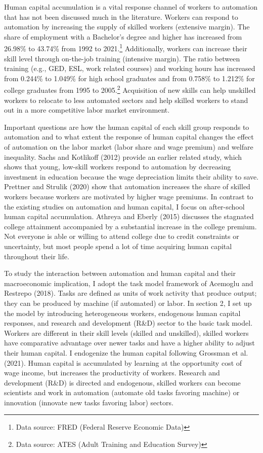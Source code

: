 \documentclass[12pt]{article}
\begin{document}
Human capital accumulation is a vital response channel of workers to automation that has not been discussed much in the literature. Workers can respond to automation by increasing the supply of skilled workers (extensive margin). The share of employment with a Bachelor's degree and higher has increased from 26.98\% to 43.74\% from 1992 to 2021.\footnote{Data source: FRED (Federal Reserve Economic Data)} Additionally, workers can increase their skill level through on-the-job training (intensive margin). The ratio between training (e.g., GED, ESL, work related courses) and working hours has increased from 0.244\% to 1.049\% for high school graduates and from 0.758\% to 1.212\% for college graduates from 1995 to 2005.\footnote{Data source: ATES (Adult Training and Education Survey)} Acquisition of new skills can help unskilled workers to relocate to less automated sectors and help skilled workers to stand out in a more competitive labor market environment. 

Important questions are how the human capital of each skill group responds to automation and to what extent the response of human capital changes the effect of automation on the labor market (labor share and wage premium) and welfare inequality. Sachs and Kotlikoff (2012)\nocite{SachsKotlikoff2012} provide an earlier related study, which shows that young, low-skill workers respond to automation by decreasing investment in education because the wage depreciation limits their ability to save. Prettner and Strulik (2020)\nocite{PrettnerStrulik2020} show that automation increases the share of skilled workers because workers are motivated by higher wage premiums. In contrast to the existing studies on automation and human capital, I focus on after-school human capital accumulation. Athreya and Eberly (2015)\nocite{AthreyaEberly2015} discusses the stagnated college attainment accompanied by a substantial increase in the college premium. Not everyone is able or willing to attend college due to credit constraints or uncertainty, but most people spend a lot of time acquiring human capital throughout their life.

To study the interaction between automation and human capital and their macroeconomic implication, I adopt the task model framework of Acemoglu and Restrepo (2018)\nocite{AcemogluRestrepo2018}. Tasks are defined as units of work activity that produce output; they can be produced by machine (if automated) or labor. In section 2, I set up the model by introducing heterogeneous workers, endogenous human capital responses, and research and development (R\&D) sector to the basic task model. Workers are different in their skill levels (skilled and unskilled), skilled workers have comparative advantage over newer tasks and have a higher ability to adjust their human capital. I endogenize the human capital following Grossman et al.(2021)\nocite{Grossmanetal2021}. Human capital is accumulated by learning at the opportunity cost of wage income, but increases the productivity of workers. Research and development (R\&D) is directed and endogenous, skilled workers can become scientists and work in automation (automate old tasks favoring machine) or innovation (innovate new tasks favoring labor) sectors. 
\end{document}

